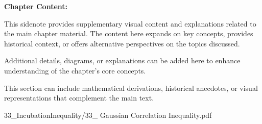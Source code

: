 \begin{SideNotePage}{
  \textbf{Chapter Content:} \par
  This sidenote provides supplementary visual content and explanations related to the main chapter material. The content here expands on key concepts, provides historical context, or offers alternative perspectives on the topics discussed.

  \vspace{0.5em}
  Additional details, diagrams, or explanations can be added here to enhance understanding of the chapter's core concepts.

  \vspace{0.5em}
  This section can include mathematical derivations, historical anecdotes, or visual representations that complement the main text.
}{33_IncubationInequality/33_ Gaussian Correlation Inequality.pdf}
\end{SideNotePage}
